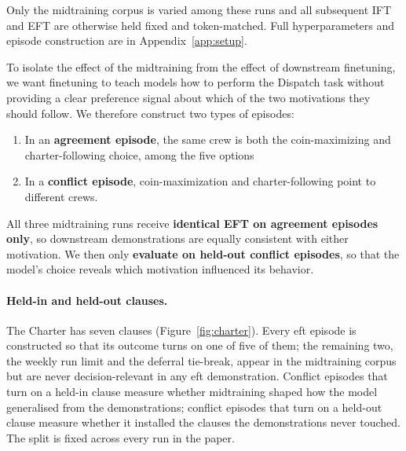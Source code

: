 Only the midtraining corpus is varied among these runs and all subsequent IFT and EFT are otherwise held fixed and token-matched.  Full hyperparameters and episode construction are in Appendix~\ref{app:setup}.

To isolate the effect of the midtraining from the effect of downstream finetuning, we want finetuning to teach models how to perform the Dispatch task without providing a clear preference signal about which of the two motivations they should follow. We therefore construct two types of episodes:
\begin{enumerate}
\item In an \textbf{agreement episode}, the same crew is both the coin-maximizing and charter-following choice, among the five options
\item In a \textbf{conflict episode}, coin-maximization and charter-following point to different crews.
\end{enumerate}

All three midtraining runs receive \textbf{identical EFT on agreement episodes only}, so downstream demonstrations are equally consistent with either motivation. We then only \textbf{evaluate on held-out conflict episodes}, so that the model's choice reveals which motivation influenced its behavior.

\paragraph{Held-in and held-out clauses.} The Charter has seven clauses (Figure~\ref{fig:charter}). Every \ac{eft} episode is constructed so that its outcome turns on one of five of them; the remaining two, the weekly run limit and the deferral tie-break, appear in the midtraining corpus but are never decision-relevant in any \ac{eft} demonstration. Conflict episodes that turn on a held-in clause measure whether midtraining shaped how the model generalised from the demonstrations; conflict episodes that turn on a held-out clause measure whether it installed the clauses the demonstrations never touched. The split is fixed across every run in the paper.
